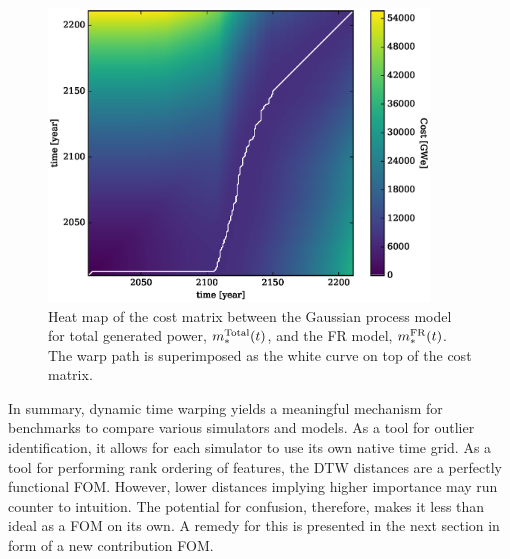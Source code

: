 \begin{figure}[htb]
\centering
\includegraphics[width=0.9\textwidth]{cost-total-model-to-fr-model.eps}
\caption{Heat map of the cost matrix between the Gaussian process model 
for total generated power, $m_*^{\mathrm{Total}}(t)$, and the FR model, 
$m_*^{\mathrm{FR}}(t)$.
The warp path is superimposed as the white curve on top of the cost matrix.}
\label{cost-total-model-to-fr-model}
\end{figure}

In summary, dynamic time warping yields a meaningful mechanism for benchmarks to 
compare various simulators and models. As a tool for
outlier identification, it allows for each simulator to use its own native 
time grid. As a tool for performing rank ordering of features, the DTW distances
are a perfectly functional FOM. However, lower distances implying higher 
importance may run counter to intuition. The potential for confusion, therefore,
makes it less than ideal as a FOM on its own. A remedy for this is presented
in the next section in form of a new contribution FOM.
